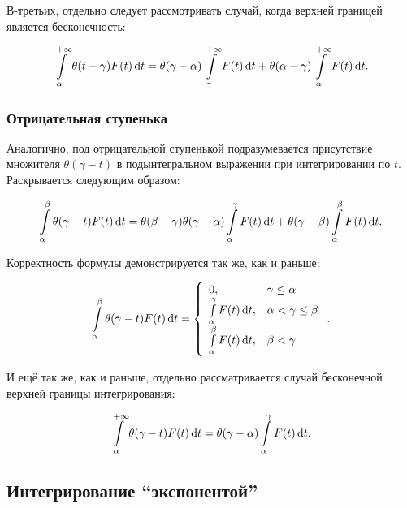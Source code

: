 \documentclass[a4paper, 12pt]{article}
\begin{document}
В-третьих, отдельно следует рассмотривать случай, когда верхней границей является бесконечность:

\begin{equation}
  \label{eq:int3}
  \int\limits_{\alpha}^{+\infty} \theta(t - \gamma) F(t) \dif t
  = \theta(\gamma - \alpha) \int\limits_{\gamma}^{+\infty} F(t) \dif t
  + \theta(\alpha - \gamma) \int\limits_{\alpha}^{+\infty} F(t) \dif t.
\end{equation}

\subsubsection{Отрицательная ступенька}

Аналогично, под отрицательной ступенькой подразумевается присутствие множителя $\theta(\gamma - t)$ в подынтегральном выражении при интегрировании по $t$. Раскрывается следующим образом:

\begin{equation}
  \label{eq:int4}
  \int\limits_{\alpha}^{\beta} \theta(\gamma - t) F(t) \dif t
  = \theta(\beta - \gamma) \theta(\gamma - \alpha) \int\limits_{\alpha}^{\gamma} F(t) \dif t
  + \theta(\gamma - \beta) \int\limits_{\alpha}^{\beta} F(t) \dif t.
\end{equation}

Корректность формулы демонстрируется так же, как и раньше:

\begin{equation*}
  \int\limits_{\alpha}^{\beta} \theta(\gamma - t) F(t) \dif t
  = \left\{
    \begin{array}{ll}
      0, &\gamma \leq \alpha \\
      \int\limits_{\alpha}^{\gamma} F(t) \dif t, &\alpha < \gamma \leq \beta \\
      \int\limits_{\alpha}^{\beta} F(t) \dif t, &\beta < \gamma
    \end{array}
  \right. .
\end{equation*}

И ещё так же, как и раньше, отдельно рассматривается случай бесконечной верхней границы интегрирования:

\begin{equation}
  \label{eq:int5}
  \int\limits_{\alpha}^{+\infty} \theta(\gamma - t) F(t) \dif t
  = \theta(\gamma - \alpha) \int\limits_{\alpha}^{\gamma} F(t) \dif t.
\end{equation}

\subsection{Интегрирование ``экспонентой''}
\end{document}
